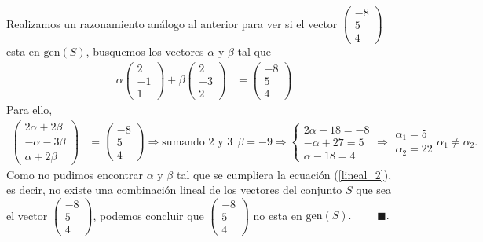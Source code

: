 \documentclass[11pt,letterpaper]{article}
\newcommand{\fin}{$\blacksquare.$}
\newcommand{\gen}{\text{gen}}
\begin{document}
\begin{enumerate}
Realizamos un razonamiento análogo al anterior para ver si el vector $\begin{pmatrix}
-8\\
5\\
4
\end{pmatrix}$ esta en $\gen (S)$, busquemos los vectores $\alpha$ y $\beta$ tal que 
\begin{align}\label{lineal_2}
\alpha \begin{pmatrix}
2\\
-1\\
1
\end{pmatrix}+\beta \begin{pmatrix}
2\\
-3\\
2
\end{pmatrix}&=\begin{pmatrix}
-8\\
5\\
4
\end{pmatrix}
\end{align}
Para ello,
\begin{align*}
\begin{pmatrix}
2\alpha+2\beta\\
-\alpha-3\beta\\
\alpha+2\beta
\end{pmatrix}&=\begin{pmatrix}
-8\\
5\\
4
\end{pmatrix}\Rightarrow\text{sumando 2 y 3}\ \ 
\beta=-9 \Rightarrow \left\{\begin{matrix}
2\alpha-18=-8\\
-\alpha+27=5\\
\alpha-18=4
\end{matrix}\right.\Rightarrow
\begin{array}{cc}
\alpha_1=5\\
\alpha_2=22
\end{array}\alpha_1\neq \alpha_2.
\end{align*}
Como no pudimos encontrar $\alpha$ y $\beta$ tal que se cumpliera la ecuación (\ref{lineal_2}), es decir, no existe una combinación lineal de los vectores del conjunto $S$ que sea el vector $\begin{pmatrix}
-8\\
5\\
4
\end{pmatrix}$,  podemos concluir que $\begin{pmatrix}
-8\\
5\\
4
\end{pmatrix}$ no esta en $\gen (S).$ \ \ \ \ \fin


\end{enumerate}
\end{document}
